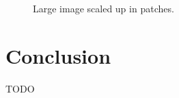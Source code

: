 \documentclass[11pt,twocolumn,twoside,paper=a4]{IEEEtran}
\begin{document}
\begin{figure}
\label{fig:large_image}
\caption{Large image scaled up in patches.}

    
\end{figure}


\begin{center}
    
\end{center}

\section*{Conclusion}
TODO




\end{document}
